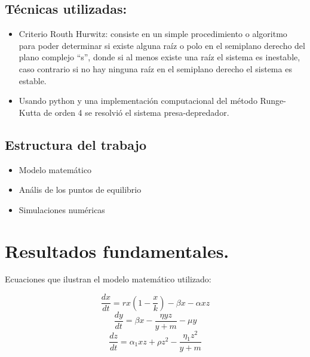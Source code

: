 \documentclass{wscpaperproc}
\theoremstyle{wsc}
\begin{document}
\subsection*{Técnicas utilizadas:}
\begin{itemize}
	\item Criterio Routh Hurwitz: consiste en un simple procedimiento o algoritmo para poder determinar si existe alguna raíz o polo en el semiplano derecho del
	      plano complejo “s”, donde si al menos existe una raíz el sistema es inestable, caso contrario si no hay ninguna raíz en el semiplano derecho el sistema es estable.
	\item Usando python y una implementación computacional del método Runge-Kutta de orden 4 se resolvió el sistema presa-depredador.
\end{itemize}
\subsection{Estructura del trabajo}
\begin{itemize}
	\item Modelo matemático
	\item Anális de los puntos de equilibrio
	\item Simulaciones numéricas
\end{itemize}

\section{Resultados fundamentales.}


Ecuaciones que ilustran el modelo matemático utilizado:

\begin{equation}\label{dx}
	\frac{dx}{dt} = rx(1-\frac{x}{k})-\beta x-\alpha xz
\end{equation}
\begin{equation}\label{dy}
	\frac{dy}{dt} = \beta x-\frac{\eta yz}{y+m}-\mu y
\end{equation}
\begin{equation}\label{dz}
	\frac{dz}{dt} = \alpha_1 xz+\rho z^2-\frac{\eta_1z^2}{y+m}
\end{equation}

\vspace*{1cm}
\end{document}
